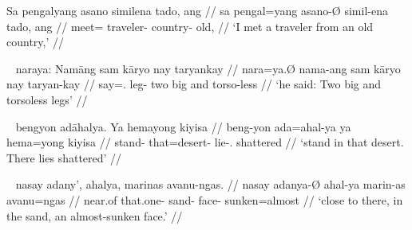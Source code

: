 
\ex\begingl
	\gla Sa pengalyang asano similena tado, ang //
	\glb sa pengal=yang asano-Ø simil-ena tado, ang //
	\glc \PatT{} meet=\Fsg{} traveler-\Top{} country-\Gen{} old, \AgtT{} //
	\glft `I met a traveler from an old country,' //
\endgl\xe

\ex~\begingl
	\gla naraya: Namāng sam kāryo nay taryankay //
	\glb nara=ya.Ø nama-ang sam kāryo nay taryan-kay //
	\glc say=\TsgM{}.\Top{} leg-\Aarg{} two big and torso-less //
	\glft `he said: Two big and torsoless legs' //
\endgl\xe

\ex~\begingl
	\gla bengyon adāhalya. Ya hemayong kiyisa //
	\glb beng-yon ada=ahal-ya ya hema=yong kiyisa //
	\glc stand-\TplN{} that=desert-\Loc{} \LocT{} lie-\TsgN{}.\Aarg{} 
		shattered //
	\glft `stand in that desert. There lies shattered' //
\endgl\xe

\ex~\begingl
	\gla nasay adany', ahalya, marinas avanu-ngas. //
	\glb nasay adanya-Ø ahal-ya marin-as avanu=ngas //
	\glc near.of that.one-\Top{} sand-\Loc{} face-\Parg{} sunken=almost //
	\glft `close to there, in the sand, an almost-sunken face.' //
\endgl\xe


